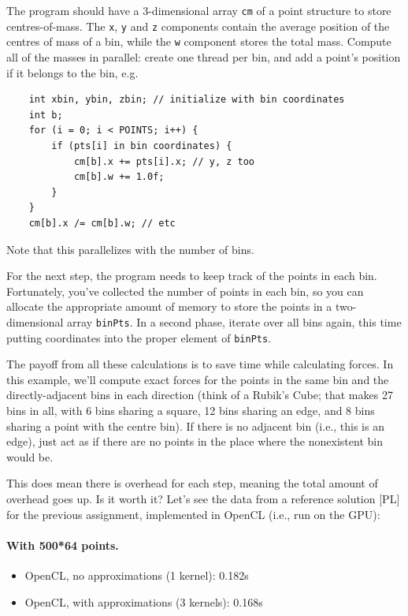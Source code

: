 \documentclass[a4paper]{report}
\begin{document}
The program should have a 3-dimensional array {\tt cm} of a point structure to store centres-of-mass. The {\tt x}, {\tt y} and {\tt z}
components contain the average position of the centres of mass of a
bin, while the {\tt w} component stores the total mass. Compute all of
the masses in parallel: create one thread per bin, and add a point's
position if it belongs to the bin, e.g.

\begin{lstlisting}
    int xbin, ybin, zbin; // initialize with bin coordinates
    int b;
    for (i = 0; i < POINTS; i++) {
        if (pts[i] in bin coordinates) {
            cm[b].x += pts[i].x; // y, z too
            cm[b].w += 1.0f;
        }
    }
    cm[b].x /= cm[b].w; // etc
\end{lstlisting}

 \noindent
Note that this parallelizes with the number of bins.

For the next step, the program needs to keep track of the points in
each bin. Fortunately, you've collected the number of points in each
bin, so you can allocate the appropriate amount of memory to store the
points in a two-dimensional array {\tt binPts}. In a second phase,
iterate over all bins again, this time putting coordinates into the
proper element of {\tt binPts}.


The payoff from all these calculations is to save time while
calculating forces. In this example, we'll compute exact
forces for the points in the same bin and the directly-adjacent bins
in each direction (think of a Rubik's Cube; that makes 27 bins in all,
with 6 bins sharing a square, 12 bins sharing an edge, and 8 bins
sharing a point with the centre bin). If there is no adjacent bin 
(i.e., this is an edge), just act as if there are no points 
in the place where the nonexistent bin would be. 

This does mean there is overhead for each step, meaning the total amount of overhead goes up. Is it worth it? Let's see the data from a reference solution [PL] for the previous assignment, implemented in OpenCL (i.e., run on the GPU):

\paragraph{With 500*64 points.}
\begin{itemize}
\item    OpenCL, no approximations (1 kernel): 0.182s
\item    OpenCL, with approximations (3 kernels): 0.168s
\end{itemize}
\end{document}
